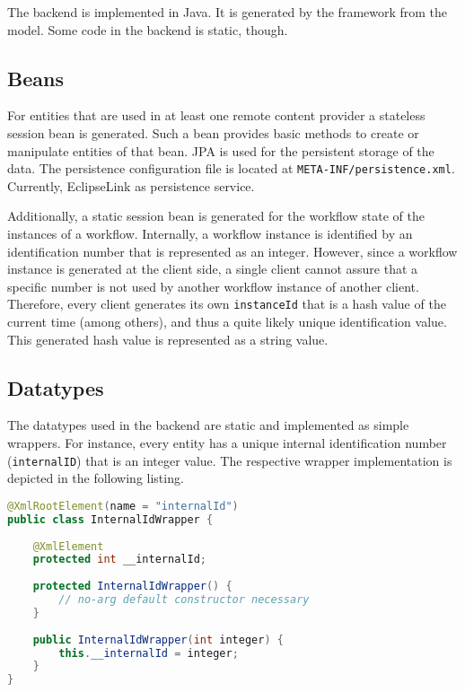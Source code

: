 
\lstset{language=Simple}

The \MD backend is implemented in Java. It is generated by the \MD framework from the \MD model. Some code in the backend is static, though. 

\subsection{Beans}
\label{subsec:beans}
For entities that are used in at least one remote content provider a stateless session bean is generated. Such a bean provides basic methods to create or manipulate entities of that bean. JPA is used for the persistent storage of the data. The persistence configuration file is located at \lstinline|META-INF/persistence.xml|. Currently, EclipseLink as persistence service.

Additionally, a static session bean is generated for the workflow state of the instances of a workflow. Internally, a workflow instance is identified by an identification number that is represented as an integer. However, since a workflow instance is generated at the client side, a single client cannot assure that a specific number is not used by another workflow instance of another client. Therefore, every client generates its own \lstinline|instanceId| that is a hash value of the current time (among others), and thus a quite likely unique identification value. This generated hash value is represented as a string value.

\subsection{Datatypes}
The datatypes used in the backend are static and implemented as simple wrappers. For instance, every entity has a unique internal identification number (\lstinline|internalID|) that is an integer value. The respective wrapper implementation is depicted in the following listing. 

\begin{lstlisting}[language=Java, label=lst:intIdWrapper, caption=An integer wrapper for the internal identification number]
@XmlRootElement(name = "internalId")
public class InternalIdWrapper {
	
	@XmlElement
	protected int __internalId;
	
	protected InternalIdWrapper() {
		// no-arg default constructor necessary
	}
	
	public InternalIdWrapper(int integer) {
		this.__internalId = integer;
	}
}
\end{lstlisting}

